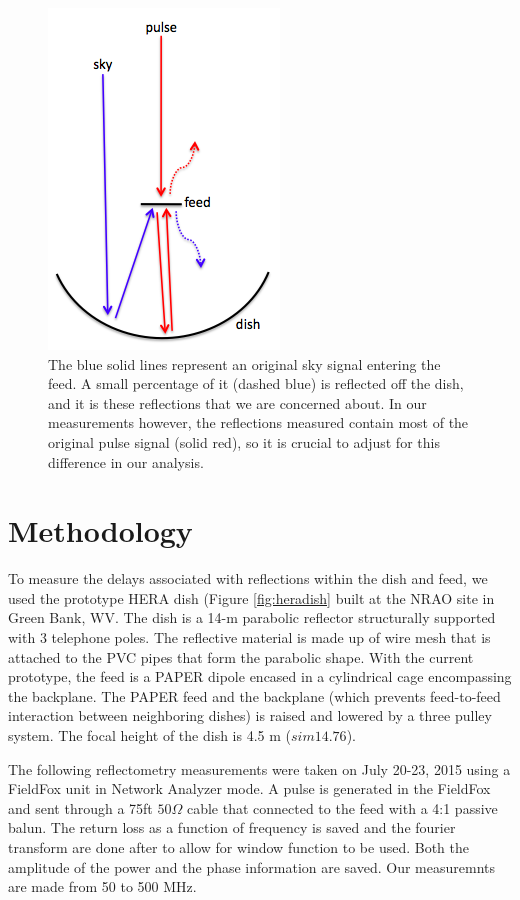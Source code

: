\documentclass[12pt,preprint]{aastex}
\begin{document}
\begin{figure}
\centering
\includegraphics[totalheight=0.5\textheight]{plots/reflection_cartoon.png}
\caption{The blue solid lines represent an original sky signal entering the feed. A small percentage of it (dashed blue) is reflected off the dish, and it is these reflections that we are concerned about. In our measurements however, the reflections measured contain most of the original pulse signal (solid red), so it is crucial to adjust for this difference in our analysis.}
\end{figure}

\section{Methodology}

To measure the delays associated with reflections within the dish and feed, we
used the prototype HERA dish (Figure \ref{fig:heradish} built at the NRAO site in
Green Bank, WV. The dish is a 14-m parabolic reflector structurally supported
with 3 telephone poles. The reflective material is made up of wire mesh that
is attached to the PVC pipes that form the parabolic shape. With the current
prototype, the feed is a PAPER dipole encased in a cylindrical cage encompassing
the backplane. The PAPER feed and the backplane (which prevents feed-to-feed
interaction between neighboring dishes) is raised and lowered by a three pulley
system. The focal height of the dish is 4.5 m ($sim{14.76}$).

The following reflectometry measurements were taken on July 20-23, 2015 using a
FieldFox unit in Network Analyzer mode. A pulse is generated in the FieldFox
and sent through a 75ft $50\Omega$ cable that connected to the feed with a 4:1
passive balun. The return loss as a function of frequency is saved and the
fourier transform are done after to allow for window function to be used. Both
the amplitude of the power and the phase information are saved. Our
measuremnts are made from 50 to 500 MHz. 
\end{document}

